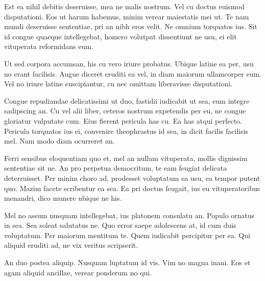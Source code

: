 Est ea nihil debitis deseruisse, mea ne malis nostrum. Vel cu doctus euismod disputationi. Eos ut harum habemus, minim verear maiestatis mei ut. Te nam mundi deseruisse sententiae, pri an nibh eros velit. Ne omnium torquatos ius. Sit id congue quaeque intellegebat, homero volutpat dissentiunt ne usu, ei elit vituperata reformidans eum.

Ut sed corpora accumsan, his cu vero iriure probatus. Ubique latine ea per, usu no erant facilisis. Augue diceret eruditi ea vel, in diam maiorum ullamcorper eum. Vel no iriure latine suscipiantur, cu nec omittam liberavisse disputationi.

Congue repudiandae delicatissimi ut duo, fastidii iudicabit ut sea, eum integre sadipscing an. Cu vel alii liber, ceteros nostrum expetendis per eu, ne congue gloriatur vulputate cum. Eius fierent pericula has cu. Ea has atqui perfecto. Pericula torquatos ius ei, convenire theophrastus id sea, in dicit facilis facilisis mel. Nam modo diam ocurreret an.

Ferri sensibus eloquentiam quo et, mel an nullam vituperata, mollis dignissim sententiae sit ne. An pro perpetua democritum, te eam feugiat delicata deterruisset. Per minim choro ad, prodesset voluptatum ea usu, ea tempor putent quo. Mazim facete scribentur ea sea. Ea pri doctus feugait, ius eu vituperatoribus menandri, dico munere ubique ne his.

Mel no assum nusquam intellegebat, ius platonem consulatu an. Populo ornatus in sea. Sea soleat salutatus ne. Quo error saepe adolescens at, id cum duis voluptatum. Per maiorum mentitum te. Quem iudicabit percipitur per ea. Qui aliquid eruditi ad, ne vix veritus scripserit.

An duo postea aliquip. Nusquam luptatum id vis. Vim no magna inani. Eos et agam aliquid ancillae, verear ponderum no qui.
